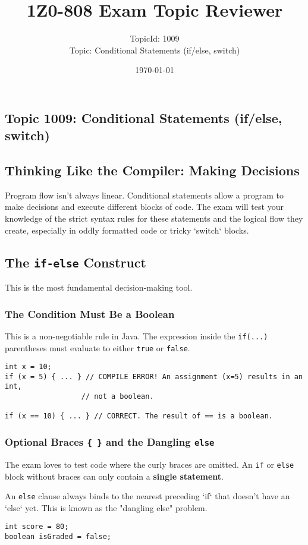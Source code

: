\documentclass[12pt]{article}
\title{\textbf{1Z0-808 Exam Topic Reviewer}}
\author{TopicId: 1009 \\ Topic: Conditional Statements (if/else, switch)}
\date{\today}
\begin{document}
\maketitle
\newpage\begin{enumerate}[label=(\arabic*)]
\section*{Topic 1009: Conditional Statements (if/else, switch)}

\subsection*{Thinking Like the Compiler: Making Decisions}
Program flow isn't always linear. Conditional statements allow a program to make decisions and execute different blocks of code. The exam will test your knowledge of the strict syntax rules for these statements and the logical flow they create, especially in oddly formatted code or tricky `switch` blocks.

\subsection*{The \texttt{if-else} Construct}
This is the most fundamental decision-making tool.

\subsubsection*{The Condition Must Be a Boolean}
This is a non-negotiable rule in Java. The expression inside the \texttt{if(...)} parentheses must evaluate to either \texttt{true} or \texttt{false}.
\begin{verbatim}
int x = 10;
if (x = 5) { ... } // COMPILE ERROR! An assignment (x=5) results in an int,
                  // not a boolean.
                  
if (x == 10) { ... } // CORRECT. The result of == is a boolean.
\end{verbatim}

\subsubsection*{Optional Braces \texttt{\{ \}} and the Dangling \texttt{else}}
The exam loves to test code where the curly braces are omitted. An \texttt{if} or \texttt{else} block without braces can only contain a \textbf{single statement}.

An \texttt{else} clause always binds to the nearest preceding `if` that doesn't have an `else` yet. This is known as the "dangling else" problem.
\begin{verbatim}
int score = 80;
boolean isGraded = false;


\end{verbatim}
\end{enumerate}
\end{document}
